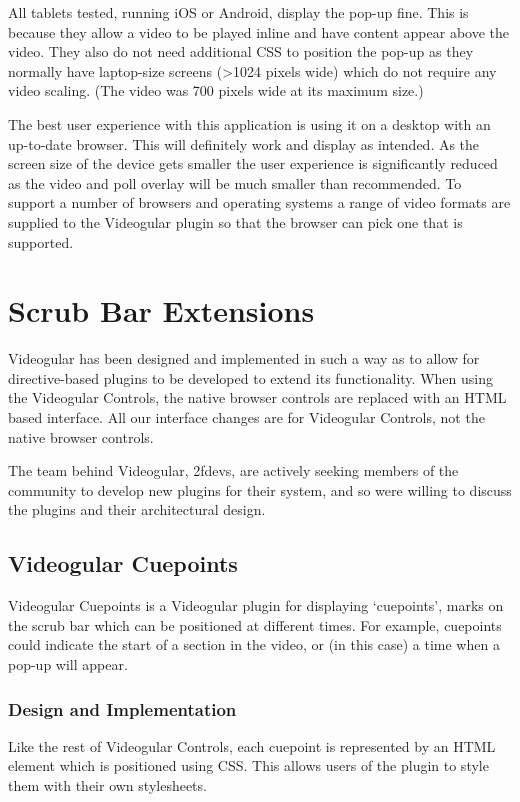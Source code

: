 All tablets tested, running iOS or Android, display the pop-up fine. This is because they allow a video to be played inline and have content appear above the video. They also do not need additional \gls{CSS} to position the pop-up as they normally have laptop-size screens (\textgreater 1024 pixels wide) which do not require any video scaling. (The video was 700 pixels wide at its maximum size.)

The best user experience with this application is using it on a desktop with an up-to-date browser. This will definitely work and display as intended. As the screen size of the device gets smaller the user experience is significantly reduced as the video and poll overlay will be much smaller than recommended. To support a number of browsers and operating systems a range of video formats are supplied to the \gls{Videogular} plugin so that the browser can pick one that is supported.

\section{Scrub Bar Extensions}
\label{Section:Scrub Bar Extensions}

\gls{Videogular} has been designed and implemented in such a way as to allow for directive-based plugins to be developed to extend its functionality. When using the \gls{Videogular} Controls, the native browser controls are replaced with an HTML based interface. All our interface changes are for \gls{Videogular} Controls, not the native browser controls.

The team behind \gls{Videogular}, 2fdevs, are actively seeking members of the community to develop new plugins for their system, and so were willing to discuss the plugins and their architectural design.

\subsection{Videogular Cuepoints}
\label{Subsection:vgCuepoints}
\gls{Videogular} Cuepoints is a \gls{Videogular} plugin for displaying `cuepoints', marks on the scrub bar which can be positioned at different times. For example, cuepoints could indicate the start of a section in the video, or (in this case) a time when a pop-up will appear.

\subsubsection{Design and Implementation}
Like the rest of Videogular Controls, each cuepoint is represented by an HTML element which is positioned using \gls{CSS}. This allows users of the plugin to style them with their own stylesheets.

